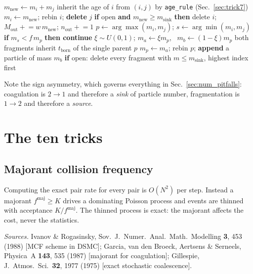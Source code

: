 \documentclass[a4paper,12pt]{article}
\newcommand{\msink}{m_{\mathrm{sink}}}
\newcommand{\fmaj}{f^{\mathrm{maj}}}
\newcommand{\code}[1]{\texttt{#1}}
\begin{document}
\begin{algorithm}[h]
\caption{The accepted event --- the only place the four cases differ}
\label{alg:event}
\begin{algorithmic}[1]
  \State $m_{\mathrm{new}} \gets m_i + m_j$
  \State inherit the age of $i$ from $(i,j)$ by \code{age\_rule} (Sec.~\ref{sec:trick7})
  \State $m_i \gets m_{\mathrm{new}}$; rebin $i$; \textbf{delete} $j$
  \State \textbf{if} open \textbf{and} $m_{\mathrm{new}} \ge \msink$ \textbf{then}
         delete $i$; $M_{\mathrm{out}} \mathrel{+}= w\,m_{\mathrm{new}}$;
         $n_{\mathrm{out}} \mathrel{+}= 1$
\Else {}
  \State $p \gets \arg\max(m_i,m_j)$; \quad $s \gets \arg\min(m_i,m_j)$
  \State \textbf{if} $m_s < f\,m_p$ \textbf{then continue}
  \State $\xi \sim U(0,1)$; \quad $m_a \gets \xi m_p$, \ $m_b \gets (1-\xi)m_p$
  \State both fragments inherit $t_{\mathrm{born}}$ of the single parent $p$
  \State $m_p \gets m_a$; rebin $p$; \textbf{append} a particle of mass $m_b$
  \State \textbf{if} open: delete every fragment with $m \le \msink$,
         highest index first
\EndIf
\end{algorithmic}
\end{algorithm}

Note the sign asymmetry, which governs everything in
Sec.~\ref{sec:num_pitfalls}: coagulation is $2 \to 1$ and therefore a
\emph{sink} of particle number, fragmentation is $1 \to 2$ and therefore a
\emph{source}.

\section{The ten tricks}
\label{sec:num_tricks}

\subsection{Majorant collision frequency}
\label{sec:trick1}

Computing the exact pair rate for every pair is $O(N^2)$ per step. Instead a
majorant $\fmaj \ge K$ drives a dominating Poisson process and events are
thinned with acceptance $K/\fmaj$. The thinned process is exact: the
majorant affects the cost, never the statistics.

\emph{Sources.} Ivanov \& Rogasinsky, Sov.\ J.\ Numer.\ Anal.\ Math.\
Modelling \textbf{3}, 453 (1988) [MCF scheme in DSMC]; Garcia, van den
Broeck, Aertsens \& Serneels, Physica~A \textbf{143}, 535 (1987) [majorant
for coagulation]; Gillespie, J.~Atmos.\ Sci.\ \textbf{32}, 1977 (1975)
[exact stochastic coalescence].
\end{document}
